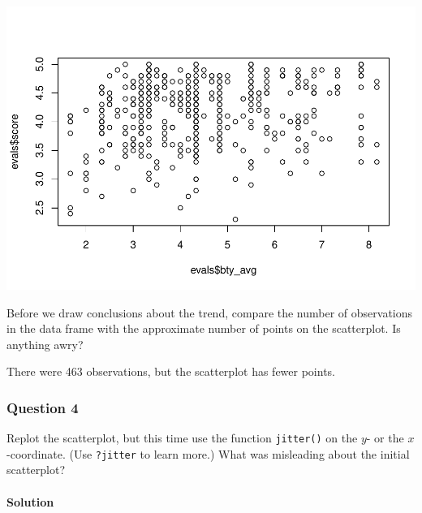 \documentclass[]{article}
\newenvironment{Shaded}{\begin{snugshade}}{\end{snugshade}}
\newcommand{\KeywordTok}[1]{\textcolor[rgb]{0.13,0.29,0.53}{\textbf{#1}}}
\newcommand{\OperatorTok}[1]{\textcolor[rgb]{0.81,0.36,0.00}{\textbf{#1}}}
\newcommand{\NormalTok}[1]{#1}
\let\oldparagraph\paragraph
\renewcommand{\paragraph}[1]{\oldparagraph{#1}\mbox{}}
\begin{document}
\includegraphics{multiple_regression_files/figure-latex/scatter-score-bty_avg-1.pdf}

Before we draw conclusions about the trend, compare the number of
observations in the data frame with the approximate number of points on
the scatterplot. Is anything awry?

There were 463 observations, but the scatterplot has fewer points.

\subsubsection{Question 4}\label{question-4}

Replot the scatterplot, but this time use the function \texttt{jitter()}
on the \(y\)- or the \(x\)-coordinate. (Use \texttt{?jitter} to learn
more.) What was misleading about the initial scatterplot?

\paragraph{Solution}\label{solution-3}

\begin{Shaded}
\end{Shaded}
\end{document}
